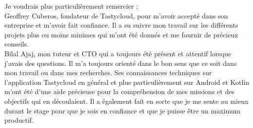 \documentclass[oneside]{book}
\theoremstyle{break}
\begin{document}
Je voudrais plus particulièrement remercier ;\\


Geoffrey Cuberos, fondateur de Tastycloud, pour m'avoir accepté dans son entreprise et m'avoir fait confiance. Il a su suivre mon travail sur les différents projets plus ou moins minimes qui m'ont été donnés et me fournir de précieux conseils.\\


Bilal Ajaj, mon tuteur et CTO qui a toujours été présent et attentif lorsque j'avais des questions. Il m'a toujours orienté dans le bon sens que ce soit dans mon travail ou dans mes recherches. Ses connaissances techniques sur l'application Tastycloud en général et plus particulièrement sur Android et Kotlin m'ont été d'une aide précieuse pour la compréhension de mes missions et des objectifs qui en découlaient. Il a également fait en sorte que je me sente au mieux durant le stage pour que je sois en confiance et que je puisse être un maximum productif. \\




\makeatletter
\def\@makechapterhead#1{%
  \vspace*{50\p@}%
  {\parindent \z@ \raggedright \normalfont
    \ifnum \c@secnumdepth >\m@ne
      \if@mainmatter
        \Huge\bfseries\space\thechapter.\space
      \fi
    \fi
    \interlinepenalty\@M
    \Huge \bfseries #1\par\nobreak
    \vskip 40\p@
  }}
\makeatother

\makeatletter
{}%
{}%
\makeatother
\newlength{\chapheadtopskip}\setlength{\chapheadtopskip}{-90pt}
\newlength{\chapheadsep}\setlength{\chapheadsep}{10pt}
\newlength{\chapheadbelowskip}\setlength{\chapheadbelowskip}{10pt}
\end{document}
